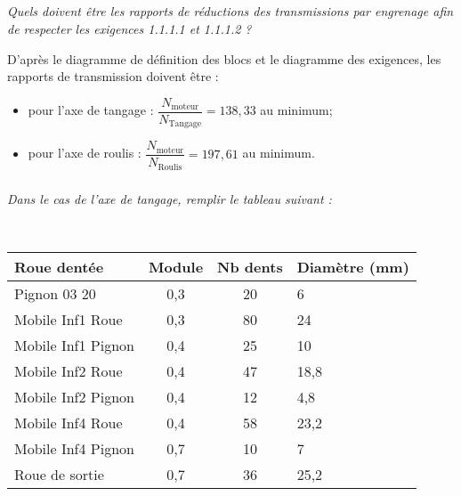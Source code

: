 \documentclass[10pt,fleqn]{article} %
\begin{document}
\begin{multicols}{2}
\begin{multicols}{2}
\subparagraph{}
\textit{Quels doivent être les rapports de réductions des transmissions par engrenage afin de respecter les exigences 1.1.1.1 et 1.1.1.2 ?}
\ifprof
\begin{corrige}
D'après le diagramme de définition des blocs et le diagramme des exigences, les rapports de transmission doivent être : 
\begin{itemize}
\item pour l'axe de tangage : $\dfrac{N_{\text{moteur}}}{N_{\text{Tangage}}}=138,33$ au minimum; 
\item pour l'axe de roulis :  $\dfrac{N_{\text{moteur}}}{N_{\text{Roulis}}}= 197,61$ au minimum.
\end{itemize}
\end{corrige}
\else
\fi


\ifprof
\subparagraph{}
\textit{Dans le cas de l'axe de tangage, remplir le tableau suivant :}
\begin{corrige} ~\\
\begin{center}
\begin{tabular}{|p{1.7cm}|c|c|p{1.3cm}|}
\hline
Roue dentée & Module & Nb dents & Diamètre (mm)\\
\hline
Pignon 03 20 & 0,3 &20        & 6		\\ \hline
Mobile Inf1 Roue & 0,3 & 80  & 24 	\\ \hline 
Mobile Inf1 Pignon & 0,4 & 25 & 10	\\ \hline
Mobile Inf2 Roue & 0,4 & 47   & 18,8	\\ \hline
Mobile Inf2 Pignon & 0,4 & 12 & 4,8	\\ \hline
Mobile Inf4 Roue & 0,4 & 58   & 23,2	\\ \hline
Mobile Inf4 Pignon & 0,7 & 10 & 7	\\ \hline
Roue de sortie & 0,7 & 36      & 25,2 \\ \hline
\end{tabular}
\end{center}
\end{corrige}
\else
\fi


\end{multicols}
\end{multicols}
\end{document}
